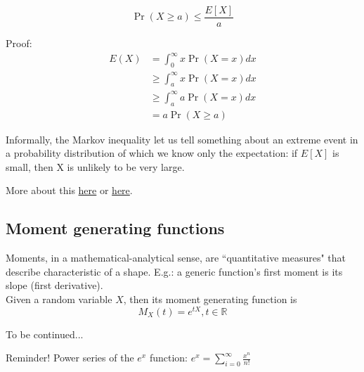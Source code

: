 	\begin{equation}\label{eq:markov}
	\Pr(X \geq a) \leq \frac{E[X]}{a}
	\end{equation}
	
	Proof:
	\begin{align*}
	E(X) &= \int_{0}^{\infty}x \Pr(X=x)dx \\
		 &\geq \int_{a}^{\infty}x\Pr(X=x)dx \\
		 &\geq \int_{a}^{\infty}a\Pr(X=x)dx \\
		 &= a\Pr(X \geq a)
	\end{align*}
	
	Informally, the Markov inequality let us tell something about an extreme event in a probability distribution of which we know only the expectation: if $E[X]$ is small, then X is unlikely to be very large.
	
	More about this \href{https://youtu.be/vjYanZ1nsZg}{here} or \href{https://ocw.mit.edu/resources/res-6-012-introduction-to-probability-spring-2018/part-i-the-fundamentals/}{here}.


\subsection{Moment generating functions}
	
	Moments, in a mathematical-analytical sense, are ``quantitative measures" that describe characteristic of a shape. E.g.: a generic function's first moment is its slope (first derivative).\\
	Given a random variable $X$, then its moment generating function is
	\begin{equation}
	M_X(t) = e^{tX}, t \in \mathbb{R}
	\end{equation}
	
	To be continued... %
	
	Reminder! Power series of the $e^x$ function: $\displaystyle e^x = \sum_{i=0}^{\infty}\frac{x^n}{n!}$
